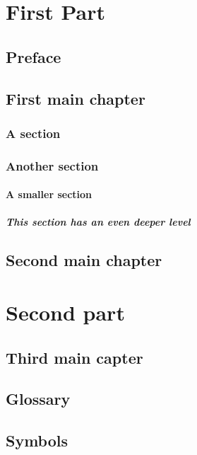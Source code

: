 \documentclass{book}
\begin{document}
\tableofcontents
\part{First Part}
\chapter*
{Preface}

\chapter{First main chapter}
\section{A section} %
\section{Another section} %
\subsection{A smaller section} %
\subsubsection[Deeper level]{This section has an even deeper level} %
\chapter{Second main chapter}
\part{Second part} %
\chapter{Third main capter}
\appendix
\cleardoublepage
{}
\chapter{Glossary}
\chapter{Symbols}
\end{document}
